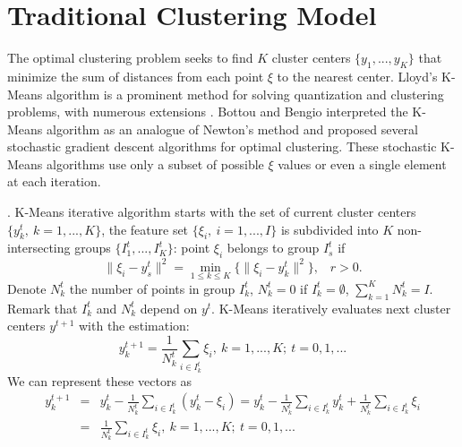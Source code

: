 \section{Traditional Clustering Model}

The optimal clustering problem seeks to find $K$ cluster centers $ \{ y_1, ..., y_K \} $ that minimize the sum of distances from each point $ \xi $ to the nearest center. Lloyd's K-Means algorithm \cite{Lloyd_1982} is a prominent method for solving quantization and clustering problems, with numerous extensions \cite{Jain_2010}. Bottou and Bengio \cite{Bottou_1994} interpreted the K-Means algorithm as an analogue of Newton's method and proposed several stochastic gradient descent algorithms for optimal clustering. These stochastic K-Means algorithms use only a subset of possible $ \xi $ values or even a single element at each iteration.
\begin{definition}
    \label{KMeans} \cite{Lloyd_1982}. K-Means iterative algorithm starts with the set of current cluster centers $ \{ y_k^t, \> k = 1, ..., K \} $, the feature set $ \{ \xi_i, \> i = 1, ..., I \} $ is subdivided into $ K $ non-intersecting groups $ \{ I_1^t, ..., I_K^t \} $: point $ \xi_i $ belongs to group $ I_s^t $ if
    \begin{equation}
        \label{kmeans-group:eq}
            \| \xi_i - y_s^t \|^2 = \min_{1 \leq k \leq K} \{ \| \xi_i - y_k^t \|^2 \},
						\;\;\; r>0.
    \end{equation}
    \noindent Denote $ N_k^t $ the number of points in group $ I_k^t $, $ N_k^t = 0 $ if $ I_k^t = \emptyset $, $ \sum_{k=1}^K N_k^t = I $. Remark that $ I_k^t $ and $ N_k^t $ depend on $ y^t $. K-Means iteratively evaluates next cluster centers $ y^{t+1} $ with the estimation:
    \begin{equation}
        \label{kmeans-center-estimation:eq}
            y_{k}^{t + 1} = \frac{1}{N_k^t} \sum_{i \in I_k^t} \xi_i, \> k = 1, ..., K; \> t = 0, 1, ...
    \end{equation}
    \noindent We can represent these vectors as
    \begin{eqnarray}
        \label{kmeans-center-alt:eq}
            y_{k}^{t + 1} &=& y_k^t - \frac{1}{N_k^t} \sum_{i \in I_k^t} (y_k^t - \xi_i) = y_k^t - \frac{1}{N_k^t} \sum_{i \in I_k^t} y_k^t + \frac{1}{N_k^t} \sum_{i \in I_k^t} \xi_i \nonumber \\
            &=& \frac{1}{N_k^t} \sum_{i \in I_k^t} \xi_i, \> k = 1, ..., K; \> t = 0, 1, ...
    \end{eqnarray}
\end{definition}

